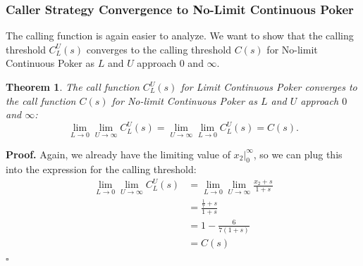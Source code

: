\documentclass[a4paper,12pt]{article}
\theoremstyle{plain}
\newtheorem{theorem}{Theorem}[section]
\theoremstyle{definition}
\newenvironment{customproof}[1][Proof]{\noindent\textbf{#1.} }{\hfill$\square$\vspace{1em}}
\begin{document}
\subsubsection{Caller Strategy Convergence to No-Limit Continuous Poker}

The calling function is again easier to analyze. We want to show that the calling threshold $C_L^U(s)$ converges to the calling threshold $C(s)$ for No-limit Continuous Poker as $L$ and $U$ approach $0$ and $\infty$.
\begin{theorem}
    The call function $C_L^U(s)$ for Limit Continuous Poker converges to the call function $C(s)$ for No-limit Continuous Poker as $L$ and $U$ approach $0$ and $\infty$:
\[
\lim_{L \to 0} \lim_{U \to \infty} C_L^U(s) = \lim_{U \to \infty} \lim_{L \to 0} C_L^U(s) = C(s).
\]
\end{theorem}
\begin{customproof}
Again, we already have the limiting value of $x_2|_0^\infty$, so we can plug this into the expression for the calling threshold:
\begin{align*}
    \lim_{L \to 0} \lim_{U \to \infty} C_L^U(s) & = \lim_{L \to 0} \lim_{U \to \infty} \frac{x_2+s}{1+s}\\
    & = \frac{\frac{1}{7}+s}{1+s}\\
    & = 1 - \frac{6}{7(1+s)}\\
    & = C(s)
\end{align*}
\end{customproof}
\end{document}

